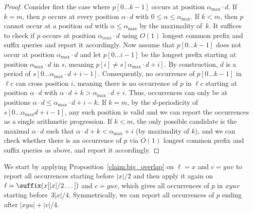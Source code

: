 \begin{proof}
Consider first the case where $p[0 \dots k-1]$ occurs at position $\alpha_{\max} \cdot d$. If $k=m$, then $p$ occurs at every position $\alpha \cdot d$ with $0 \leq \alpha \leq \alpha_{\max}$. If $k<m$, then $p$ cannot occur at a position $\alpha d$ with $\alpha \leq \alpha_{\max}$ by the maximality of~$k$.
It suffices to check if $p$ occurs at position $\alpha_{max} \cdot d$ using $O(1)$ longest common prefix and suffix queries and report it accordingly. Now assume that $p[0 \dots k-1]$ does not occur at position $\alpha_{\max}\cdot  d$ and let $p[0 \dots i-1]$ be the longest prefix starting at position $\alpha_{\max} \cdot d$ in $s$, meaning $p[i] \neq s[\alpha_{\max} \cdot d +i]$.
By construction, $d$ is a period of $s[0 \dots \alpha_{\max} \cdot d + i-1]$. Consequently, no occurrence of $p[0 \dots k-1]$ in $\ell c$ can cross position $i$, meaning there is no occurrence of $p$ in $\ell c$ starting at position $\alpha \cdot d$ with $\alpha \cdot d + k > \alpha_{\max} \cdot d + i$. Thus, occurrences can only be at positions $\alpha \cdot d \leq \alpha_{\max} \cdot d +i-k$. If $k=m$, by the $d$-periodicity of $s[0 \dots \alpha_{\max} d + i-1]$, any such position is valid and we can report the occurrences as a single arithmetic progression.
If $k<m$, the only possible candidate is the maximal $\alpha \cdot d$ such that $\alpha \cdot d +k < \alpha_{\max} +i $ (by maximality of $k$), and we can check whether there is an occurrence of $p$ via $O(1)$ longest common prefix and suffix queries as above, and report it accordingly.
\end{proof}

We start by applying Proposition~\ref{claim:big_overlap} on $\ell = x$ and $c = yuv$ to report all occurrences starting before $|x|/2$ and then apply it again on $\ell = \suffix(x[|x|/2 \dots])$ and $c = yuv$, which gives all occurrences of $p$ in $xyuv$ starting before~$3|x|/4$. Symmetrically, we can report all occurrences of $p$ ending after $|xyu| + |v|/4$. 

